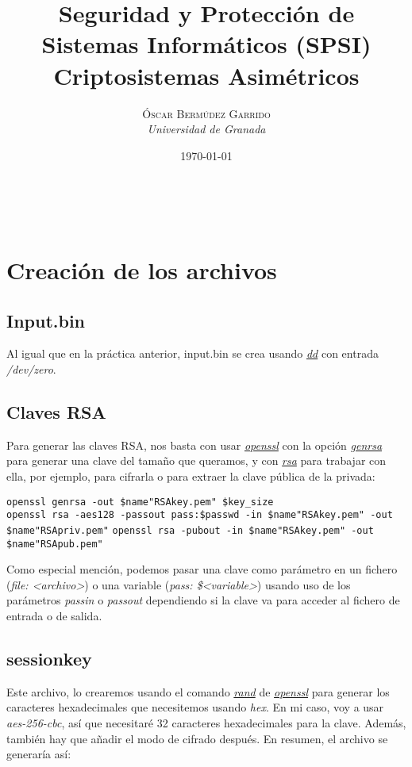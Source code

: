 \documentclass[a4paper, 11pt]{article}
\title{\textbf{Seguridad y Protección de Sistemas Informáticos (SPSI)}\\ %
Criptosistemas Asimétricos} %
\author{\textsc{Óscar Bermúdez Garrido} %
\\{\textit{Universidad de Granada}}} %
\date{\today} %
\makeatletter
\renewcommand{\maketitle}{
  \begin{flushright} %
  
  {\LARGE\@title} %
  
  \vspace{50pt} %
  
  {\large\@author} %
  \\\@date %
  \vspace{40pt} %
  \end{flushright}
}
\makeatother
\begin{document}
\maketitle %

\renewcommand{\abstractname}{Resumen} %

{\parskip=2pt
  \tableofcontents
}
\pagebreak


\section{Creación de los archivos}
	\subsection{Input.bin}
		Al igual que en la práctica anterior, input.bin se crea usando \href{http://manpages.ubuntu.com/manpages/zesty/en/man1/dd.1.html}
		{\textit{dd}} con entrada \textit{/dev/zero}.
		
	\subsection{Claves RSA}
		Para generar las claves RSA, nos basta con usar \href{http://manpages.ubuntu.com/manpages/zesty/en/man1/openssl.1ssl.html}
		{\textit{openssl}} con la opción \href{https://www.openssl.org/docs/man1.0.2/apps/genrsa.html}{\textit{genrsa}} para
		generar una clave del tamaño que queramos, y con \href{https://www.openssl.org/docs/man1.0.2/apps/rsa.html}{\textit{rsa}}
		para trabajar con ella, por ejemplo, para cifrarla o para extraer la clave pública de la privada:
		\begin{small}
			\verb|openssl genrsa -out $name"RSAkey.pem" $key_size| \\
			\verb|openssl rsa -aes128 -passout pass:$passwd -in $name"RSAkey.pem" -out $name"RSApriv.pem"|
			\verb|openssl rsa -pubout -in $name"RSAkey.pem" -out $name"RSApub.pem"|
		\end{small}
		
		Como especial mención, podemos pasar una clave como parámetro en un fichero (\textit{file: <archivo>}) o una variable
		(\textit{pass: \$<variable>}) usando uso de los parámetros \textit{passin} o \textit{passout} dependiendo si la clave
		va para acceder al fichero de entrada o de salida.
		
	\subsection{sessionkey}
	    Este archivo, lo crearemos usando el comando \href{https://www.openssl.org/docs/man1.0.2/apps/rand.html}{\textit{rand}} de \href{http://manpages.ubuntu.com/manpages/zesty/en/man1/openssl.1ssl.html}{\textit{openssl}} para generar los caracteres
	    hexadecimales que necesitemos usando \textit{hex}. En mi caso, voy a usar \textit{aes-256-cbc}, así que necesitaré 32
	    caracteres hexadecimales para la clave. Además, también hay que añadir el modo de cifrado después. En resumen, el archivo
	    se generaría así:
		
\end{document}
